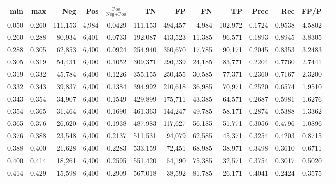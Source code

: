 \begin{tabular}{rrrrrrrrrrrrr}
\toprule
  min &   max &     Neg &   Pos & $\frac{\text{Pos}}{\text{Neg}+\text{Pos}}$ &      TN &      FP &      FN &      TP &   Prec &    Rec &   FP/P \\
\midrule
0.050 & 0.260 & 111,153 & 4,984 &                                     0.0429 & 111,153 & 494,457 &   4,984 & 102,972 & 0.1724 & 0.9538 & 4.5802 \\
0.260 & 0.288 &  80,934 & 6,401 &                                     0.0733 & 192,087 & 413,523 &  11,385 &  96,571 & 0.1893 & 0.8945 & 3.8305 \\
0.288 & 0.305 &  62,853 & 6,400 &                                     0.0924 & 254,940 & 350,670 &  17,785 &  90,171 & 0.2045 & 0.8353 & 3.2483 \\
0.305 & 0.319 &  54,431 & 6,400 &                                     0.1052 & 309,371 & 296,239 &  24,185 &  83,771 & 0.2204 & 0.7760 & 2.7441 \\
0.319 & 0.332 &  45,784 & 6,400 &                                     0.1226 & 355,155 & 250,455 &  30,585 &  77,371 & 0.2360 & 0.7167 & 2.3200 \\
0.332 & 0.343 &  39,837 & 6,400 &                                     0.1384 & 394,992 & 210,618 &  36,985 &  70,971 & 0.2520 & 0.6574 & 1.9510 \\
0.343 & 0.354 &  34,907 & 6,400 &                                     0.1549 & 429,899 & 175,711 &  43,385 &  64,571 & 0.2687 & 0.5981 & 1.6276 \\
0.354 & 0.365 &  31,464 & 6,400 &                                     0.1690 & 461,363 & 144,247 &  49,785 &  58,171 & 0.2874 & 0.5388 & 1.3362 \\
0.365 & 0.376 &  26,620 & 6,400 &                                     0.1938 & 487,983 & 117,627 &  56,185 &  51,771 & 0.3056 & 0.4796 & 1.0896 \\
0.376 & 0.388 &  23,548 & 6,400 &                                     0.2137 & 511,531 &  94,079 &  62,585 &  45,371 & 0.3254 & 0.4203 & 0.8715 \\
0.388 & 0.400 &  21,628 & 6,400 &                                     0.2283 & 533,159 &  72,451 &  68,985 &  38,971 & 0.3498 & 0.3610 & 0.6711 \\
0.400 & 0.414 &  18,261 & 6,400 &                                     0.2595 & 551,420 &  54,190 &  75,385 &  32,571 & 0.3754 & 0.3017 & 0.5020 \\
0.414 & 0.429 &  15,598 & 6,400 &                                     0.2909 & 567,018 &  38,592 &  81,785 &  26,171 & 0.4041 & 0.2424 & 0.3575 \\

\end{tabular}
